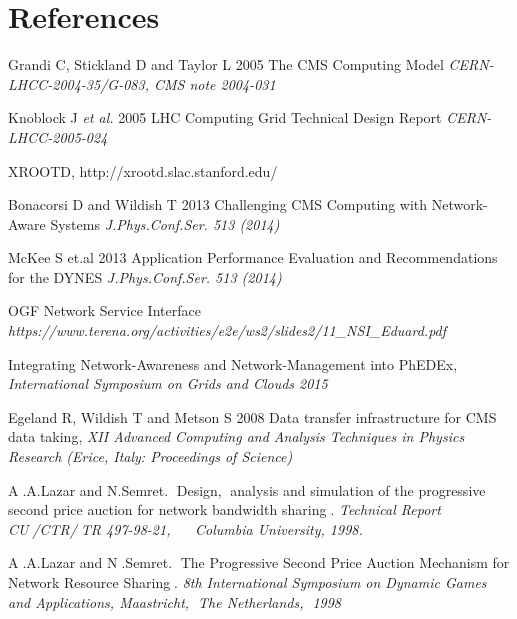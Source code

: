 \section*{References}

\begin{thebibliography}{1}

  Grandi C, Stickland D and Taylor L 2005 The CMS Computing Model {\it CERN-LHCC-2004-35/G-083, CMS note 2004-031}

 Knoblock J {\it et al.} 2005 LHC Computing Grid Technical Design Report {\it CERN-LHCC-2005-024}

 XROOTD, http://xrootd.slac.stanford.edu/

 Bonacorsi D and Wildish T 2013 Challenging CMS Computing with Network-Aware Systems {\it J.Phys.Conf.Ser. 513 (2014)}

 McKee S et.al 2013 Application Performance Evaluation and Recommendations for the DYNES {\it J.Phys.Conf.Ser. 513 (2014)}

 OGF Network Service Interface {\it https://www.terena.org/activities/e2e/ws2/slides2/11\_NSI\_Eduard.pdf}

 Integrating Network-Awareness and Network-Management into PhEDEx, {\it International Symposium on Grids and Clouds 2015}

 Egeland R, Wildish T and Metson S 2008 Data transfer infrastructure for CMS data taking,  {\it XII Advanced Computing and Analysis Techniques in Physics Research (Erice, Italy: Proceedings of Science)}

 A􏰅.A.Lazar and N.Semret.􏰅 Design,􏰃 analysis and simulation of the progressive second price auction for network bandwidth sharing􏰅. {\it Technical Report CU􏰒/CTR/􏰒TR 497-98-21,􏰍􏰄􏰈􏰇􏰃 Columbia University, 1998.}


 A􏰅.A.Lazar and N􏰅.Semret.􏰅 The Progressive Second Price Auction Mechanism for Network Resource Sharing􏰅. {\it 8th International Symposium on Dynamic
Games and Applications, Maastricht,􏰃 The Netherlands,􏰃 1998 􏰇􏰎􏰎􏰍}􏰅

\end{thebibliography}